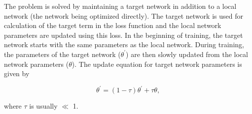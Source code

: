 The problem is solved by maintaining a target network in addition to a local network (the network being optimized directly). The target network is used for calculation of the target term in the loss function and the local network parameters are updated using this loss. In the beginning of training, the target network starts with the same parameters as the local network. During training, the parameters of the target network ($\theta^\prime$) are then slowly updated from the local network parameters ($\theta$). The update equation for target network parameters is given by 

\begin{equation}
\theta^\prime = (1-\tau)\theta^\prime + \tau \theta,
\end{equation}

where $\tau$ is usually $\ll$ 1.





